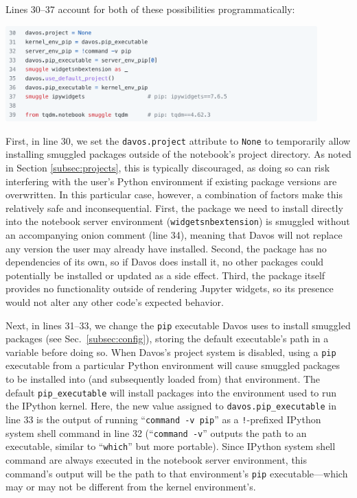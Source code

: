 \documentclass[preprint,12pt,a4paper]{elsarticle}
\begin{document}
Lines 30--37 account for both of these possibilities programmatically:
\begin{center}
\includegraphics[width=0.9\textwidth]{figs/example7}
\end{center}
First, in line 30, we set the \texttt{davos.project} attribute to \texttt{None} to temporarily 
allow installing smuggled packages outside of the notebook's project directory. 
As noted in Section \ref{subsec:projects}, this is typically discouraged, as doing so can risk interfering with the user's Python environment if existing package versions are overwritten.
In this particular case, however, a combination of factors make this relatively safe and inconsequential.
First, the package we need to install directly into the notebook server environment (\texttt{widgetsnbextension}) is smuggled without an accompanying onion comment (line 34), meaning that Davos will not replace any version the user may already have installed.
Second, the package has no dependencies of its own, so if Davos does install it, no other packages could potentially be installed or updated as a side effect.
Third, the package itself provides no functionality outside of rendering Jupyter widgets, so its presence would not alter any other code's expected behavior.

Next, in lines 31--33, we change the \texttt{pip} executable Davos uses to install smuggled packages (see Sec.~\ref{subsec:config}), storing the default executable's path in a variable before doing so. 
When Davos's project system is disabled, using a \texttt{pip} executable from a particular Python environment will cause smuggled packages to be installed into (and subsequently loaded from) that environment. 
The default \texttt{pip\_executable} will install packages into the environment used to run the IPython kernel. 
Here, the new value assigned to \texttt{davos.pip\_executable} in line 33 is the output of running ``\texttt{command -v pip}'' as a \texttt{!}-prefixed IPython system shell command in line 32 (``\texttt{command -v}'' outputs the path to an executable, similar to ``\texttt{which}'' but more portable). 
Since IPython system shell command are always executed in the notebook server environment, this command's output will be the path to that environment's \texttt{pip} executable---which may or may not be different from the kernel environment's.
\end{document}
